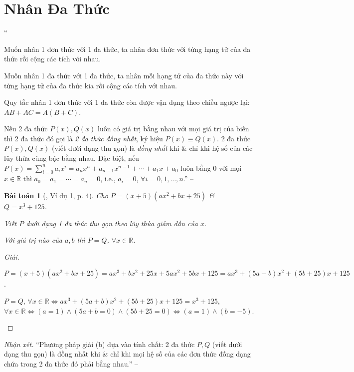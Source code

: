 \documentclass{article}
\numberwithin{equation}{section}
\newtheorem{baitoan}{Bài toán}
\begin{document}
\section{Nhân Đa Thức}
``\begin{enumerate*}
	\item[\textbf{1.}] Muốn nhân 1 đơn thức với 1 đa thức, ta nhân đơn thức với từng hạng tử của đa thức rồi cộng các  tích với nhau.
	\item[\textbf{2.}] Muốn nhân 1 đa thức với 1 đa thức, ta nhân mỗi hạng tử của đa thức này với từng hạng tử của đa thức kia rồi cộng các tích với nhau.
	\item[\textbf{3.}] Quy tắc nhân 1 đơn thức với 1 đa thức còn được vận dụng theo chiều ngược lại: $AB + AC = A(B + C)$.
	\item[\textbf{4.}] Nếu 2 đa thức $P(x),Q(x)$ luôn có giá trị bằng nhau với mọi giá trị của biến thì 2 đa thức đó gọi là \textit{2 đa thức đồng nhất}, ký hiệu $P(x)\equiv Q(x)$. 2 đa thức $P(x),Q(x)$ (viết dưới dạng thu gọn) là \textit{đồng nhất} khi \& chỉ khi hệ số của các lũy thừa cùng bậc bằng nhau. Đặc biệt, nếu $P(x) = \sum_{i=0}^n a_ix^i = a_nx^n + a_{n-1}x^{n-1} + \cdots + a_1x + a_0$ luôn bằng $0$ với mọi $x\in\mathbb{R}$ thì $a_0 = a_1 = \cdots = a_n = 0$, i.e., $a_i = 0$, $\forall i = 0,1,\ldots,n$.'' -- \cite[Chap. 1, \S1, p. 4]{Tuyen_Toan_8}
\end{enumerate*}

\begin{baitoan}[\cite{Tuyen_Toan_8}, Ví dụ 1, p. 4]
	Cho $P = (x + 5)(ax^2 + bx + 25)$ \& $Q = x^3 + 125$.
	\begin{enumerate*}
		\item[(a)] Viết $P$ dưới dạng 1 đa thức thu gọn theo lũy thừa giảm dần của $x$.
		\item[(b)] Với giá trị nào của $a,b$ thì $P = Q$, $\forall x\in\mathbb{R}$.
	\end{enumerate*}	
\end{baitoan}

\begin{proof}[Giải]
	\begin{enumerate*}
		\item[(a)] $P = (x + 5)(ax^2 + bx + 25) = ax^3 + bx^2 + 25x + 5ax^2 + 5bx + 125 = ax^3 + (5a + b)x^2 + (5b + 25)x + 125$.
		\item[(b)] $P = Q$, $\forall x\in\mathbb{R}\Leftrightarrow ax^3 + (5a + b)x^2 + (5b + 25)x + 125 = x^3 + 125$, $\forall x\in\mathbb{R}\Leftrightarrow(a = 1)\land(5a + b = 0)\land(5b + 25 = 0)\Leftrightarrow(a = 1)\land(b = -5)$.
	\end{enumerate*}
\end{proof}
\noindent\textit{Nhận xét.} ``Phương pháp giải (b) dựa vào tính chất: 2 đa thức $P,Q$ (viết dưới dạng thu gọn) là đồng nhất khi \& chỉ khi mọi hệ số của các đơn thức đồng dạng chứa trong 2 đa thức đó phải bằng nhau.'' -- \cite[p. 5]{Tuyen_Toan_8}
\end{document}
